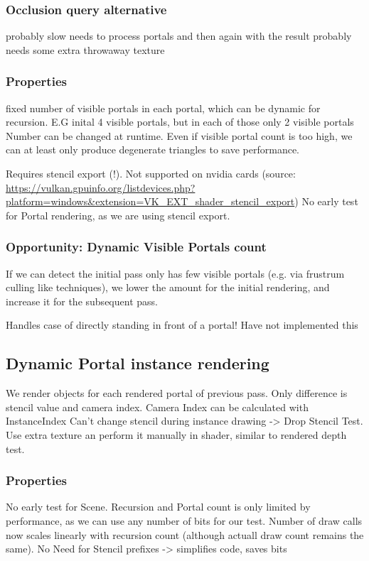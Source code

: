\subsubsection{Occlusion query alternative}
probably slow
needs to process portals and then again with the result
probably needs some extra throwaway texture

\subsubsection{Properties}
fixed number of visible portals in each portal, which can be dynamic for recursion. E.G inital 4 visible portals, but in each of those only 2 visible portals
Number can be changed at runtime.
Even if visible portal count is too high, we can at least only produce degenerate triangles to save performance.

Requires stencil export (!). Not supported on nvidia cards (source: \url{https://vulkan.gpuinfo.org/listdevices.php?platform=windows&extension=VK_EXT_shader_stencil_export})
No early test for Portal rendering, as we are using stencil export.

\subsubsection{Opportunity: Dynamic Visible Portals count}
If we can detect the initial pass only has few visible portals (e.g. via frustrum culling like techniques), we lower the amount for the initial rendering, and increase it for
the subsequent pass.

Handles case of directly standing in front of a portal!
Have not implemented this

\subsection{Dynamic Portal instance rendering}
We render objects for each rendered portal of previous pass. Only difference is stencil value and camera index.
Camera Index can be calculated with InstanceIndex
Can't change stencil during instance drawing -> Drop Stencil Test. Use extra texture an perform it manually in shader, similar to rendered depth test. 

\subsubsection{Properties}
No early test for Scene.
Recursion and Portal count is only limited by performance, as we can use any number of bits for our test.
Number of draw calls now scales linearly with recursion count (although actuall draw count remains the same).
No Need for Stencil prefixes -> simplifies code, saves bits

